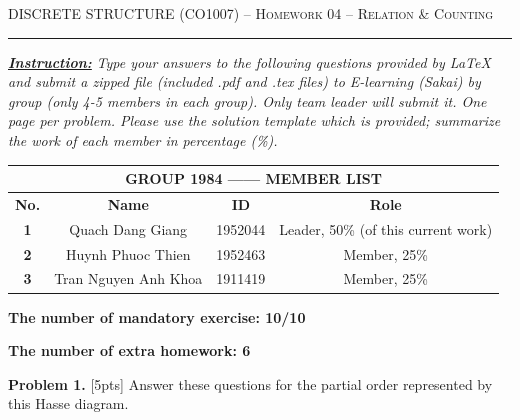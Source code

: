 \documentclass[12pt]{amsart}
\begin{document}
\pagestyle{plain}
{\scshape } \hfill {\scshape DISCRETE STRUCTURE (CO1007) -- Homework 04 -- Relation \& Counting} \hfill {\scshape }
 
\smallskip

\hrule

\bigskip
\textbf{\underline {\textit{Instruction:}}}
\textit{Type your answers to the following questions provided by LaTeX and submit a zipped file
(included .pdf and .tex files) to E-learning (Sakai) by group (only 4-5 members in each group). Only team
leader will submit it. One page per problem. Please use the solution template which is provided; summarize
the work of each member in percentage (\%).}

\bigskip
\begin{table}[h]
\begin{tabular}{|c|c|c|c|}
\hline
\multicolumn{4}{|c|}{\textbf{GROUP 1984 ------ MEMBER LIST}}        \\ \hline
\textbf{No.} & \textbf{Name}        & \textbf{ID} & \textbf{Role} \\ \hline
\textbf{1}   & Quach Dang Giang     & 1952044     & Leader, 50\% (of this current work)        \\ \hline
\textbf{2}   & Huynh Phuoc Thien    & 1952463     & Member, 25\%      \\ \hline
\textbf{3}   & Tran Nguyen Anh Khoa & 1911419     & Member, 25\%        \\ \hline
\end{tabular}
\end{table}
\bigskip
\bigskip

\textbf{The number of mandatory exercise: 10/10}  

\bigskip
\textbf{The number of extra homework: 6}

\bigskip
\textbf{Problem 1.} [5pts] Answer these questions for the partial order represented by this Hasse diagram.
\bigskip

\end{document}
